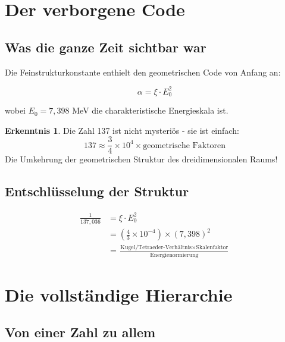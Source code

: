 \documentclass[12pt,a4paper]{article}
\theoremstyle{definition}
\newtheorem{erkenntnis}{Erkenntnis}[section]
\begin{document}
	\section{Der verborgene Code}
	
	\subsection{Was die ganze Zeit sichtbar war}
	
	Die Feinstrukturkonstante enthielt den geometrischen Code von Anfang an:
	
	\begin{equation}
		\alpha = \xi \cdot E_0^2
	\end{equation}
	
	wobei $E_0 = 7,398$ MeV die charakteristische Energieskala ist.
	
	\begin{erkenntnis}
		Die Zahl 137 ist nicht mysteriös - sie ist einfach:
		\begin{equation}
			137 \approx \frac{3}{4} \times 10^4 \times \text{geometrische Faktoren}
		\end{equation}
		Die Umkehrung der geometrischen Struktur des dreidimensionalen Raums!
	\end{erkenntnis}
	
	\subsection{Entschlüsselung der Struktur}
	
	\begin{fundamental}
		\begin{align}
			\frac{1}{137,036} &= \xi \cdot E_0^2\\
			&= \left(\frac{4}{3} \times 10^{-4}\right) \times (7,398)^2\\
			&= \frac{\text{Kugel/Tetraeder-Verhältnis} \times \text{Skalenfaktor}}{\text{Energienormierung}}
		\end{align}
	\end{fundamental}
	
	\section{Die vollständige Hierarchie}
	
	\subsection{Von einer Zahl zu allem}
	
\end{document}
